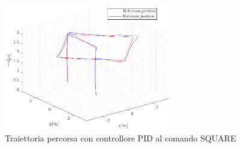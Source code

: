 \begin{figure}
	\centering
	\includegraphics[width=0.65\textwidth]{Simulazioni/Figure/PID/SQUARE/Trajectory}
	\caption{Traiettoria percorsa con controllore PID al comando SQUARE}
	\label{fig:SQUAREtraPID}
\end{figure}

